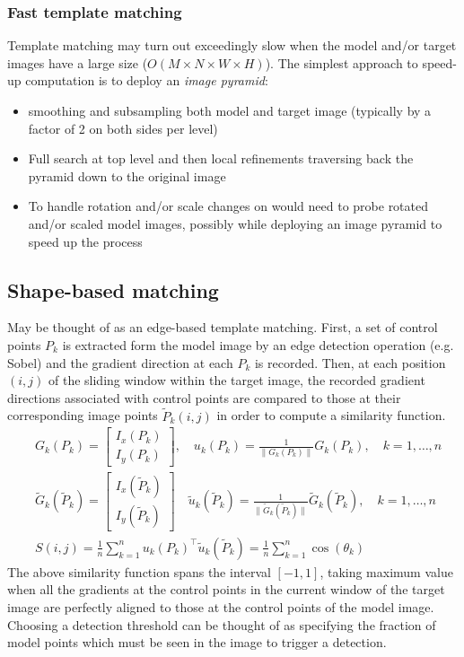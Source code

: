 \documentclass{article}
\begin{document}
\subsubsection{Fast template matching}
Template matching may turn out exceedingly slow when the model and/or target images have a large size ($O(M\times N \times W \times H)$). The simplest approach to speed-up computation is to deploy an \emph{image pyramid}:
\begin{itemize}
    \item smoothing and subsampling both model and target image (typically by a factor of 2 on both sides per level) 
    \item Full search at top level and then local refinements traversing back the pyramid down to the original image 
    \item To handle rotation and/or scale changes on would need to probe rotated and/or scaled model images, possibly while deploying an image pyramid to speed up the process
\end{itemize}

\subsection{Shape-based matching}
May be thought of as an edge-based template matching. First, a set of control points $P_k$ is extracted form the model image by an edge detection operation (e.g. Sobel) and the gradient direction at each $P_k$ is recorded. 
Then, at each position $(i,j)$ of the sliding window within the target image, the recorded gradient directions associated with control points are compared to those at their corresponding image points $\tilde{P}_k(i,j)$ in order to compute a similarity function.
\begin{align*}
    &G_k(P_k) = \begin{bmatrix}
        I_x(P_k) \\ I_y(P_k)
    \end{bmatrix}, \quad u_k(P_k) = \displaystyle\frac{1}{\|G_k(P_k)\|}G_k(P_k), \quad k=1,\dots,n\\ 
    &\tilde{G}_k(\tilde{P}_k) = \begin{bmatrix}
        I_x(\tilde{P}_k) \\ I_y(\tilde{P}_k)
    \end{bmatrix} \quad \tilde{u}_k(\tilde{P}_k) = \displaystyle\frac{1}{\|\tilde{G}_k(\tilde{P}_k)\|}\tilde{G}_k(\tilde{P}_k), \quad k=1,\dots,n\\
    &S(i,j) = \displaystyle\frac{1}{n} \displaystyle\sum_{k=1}^{n}u_k(P_k)^\top \tilde{u}_k(\tilde{P}_k) = \displaystyle\frac{1}{n} \displaystyle\sum_{k=1}^{n}\cos(\theta_k)
\end{align*}
The above similarity function spans the interval $[-1,1]$, taking maximum value when all the gradients at the control points in the current window of the target image are perfectly aligned to those at the control points of the model image. Choosing a detection threshold can be thought of as specifying the fraction of model points which must be seen in the image to trigger a detection.
\end{document}
